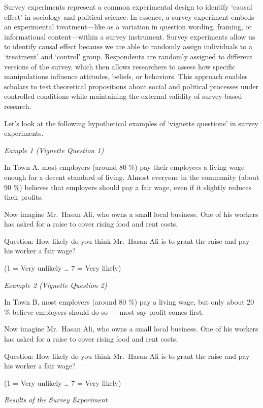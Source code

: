 \documentclass[
  letterpaper,
  DIV=11,
  numbers=noendperiod]{scrreprt}
\begin{document}
Survey experiments represent a common experimental design to identify
`causal effect' in sociology and political science. In essence, a survey
experiment embeds an experimental treatment---like as a variation in
question wording, framing, or informational content---within a survey
instrument. Survey experiments allow us to identify causal effect
because we are able to randomly assign individuals to a `treatment' and
`control' group. Respondents are randomly assigned to different versions
of the survey, which then allows researchers to assess how specific
manipulations influence attitudes, beliefs, or behaviors. This approach
enables scholars to test theoretical propositions about social and
political processes under controlled conditions while maintaining the
external validity of survey-based research.

Let's look at the following hypothetical examples of `vignette
questions' in survey experiments.

\emph{Eample 1 (Vignette Question 1)}

In Town A, most employers (around 80 \%) pay their employees a living
wage --- enough for a decent standard of living. Almost everyone in the
community (about 90 \%) believes that employers should pay a fair wage,
even if it slightly reduces their profits.

Now imagine Mr.~Hasan Ali, who owns a small local business. One of his
workers has asked for a raise to cover rising food and rent costs.

Question: How likely do you think Mr.~Hasan Ali is to grant the raise
and pay his worker a fair wage?

(1 = Very unlikely \ldots{} 7 = Very likely)

\emph{Example 2 (Vignette Question 2)}

In Town B, most employers (around 80 \%) pay a living wage, but only
about 20 \% believe employers should do so --- most say profit comes
first.

Now imagine Mr.~Hasan Ali, who owns a small local business. One of his
workers has asked for a raise to cover rising food and rent costs.

Question: How likely do you think Mr.~Hasan Ali is to grant the raise
and pay his worker a fair wage?

(1 = Very unlikely \ldots{} 7 = Very likely)

\emph{Results of the Survey Experiment}
\end{document}
